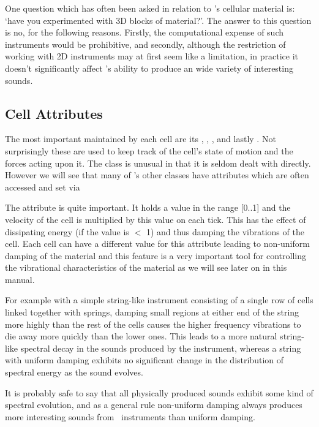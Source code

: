 One question which has often been asked in relation to \tao's cellular
material is: `have you experimented with 3D blocks of material?'. The answer
to this question is no, for the following reasons. Firstly, the computational
expense of such instruments would be prohibitive, and secondly, although the
restriction of working with 2D instruments may at first seem like a limitation,
in practice it doesn't significantly affect \tao's ability to produce an
wide variety of interesting sounds.

\subsection{Cell Attributes}
\label{section:cell_attributes}
The most important  maintained by each cell are its
, , , 
 and lastly . Not
surprisingly these are used to keep track of the cell's state of motion
and the forces acting upon it. The  class is unusual in
that it is seldom dealt with directly. However we will see that many
of \tao's other classes have attributes which are often accessed
and set via 

The  attribute is quite important. It holds
a value in the range [0..1] and the velocity of the cell is multiplied
by this value on each tick. This has the effect of dissipating energy (if the
value is $<$ 1) and thus damping the vibrations of the cell. Each cell
can have a different value for this attribute leading to non-uniform
damping of the material and this feature is a very important tool for
controlling the vibrational characteristics of the material as we will
see later on in this manual. 

For example with a simple string-like instrument consisting of a single row
of cells linked together with springs, damping small regions at either end
of the string more highly than the rest of the cells
causes the higher frequency vibrations to die away more quickly than the
lower ones. This leads to a more natural string-like spectral decay in the
sounds produced by the instrument, whereas a string with uniform damping
exhibits no significant change in the distribution of spectral energy as
the sound evolves. 

It is probably safe to say that all physically produced sounds
exhibit some kind of spectral evolution, and as a general rule
non-uniform damping always produces more interesting sounds from
\tao\ instruments than uniform damping.

